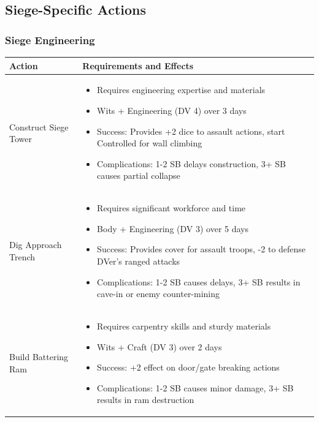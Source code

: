 \documentclass[11pt,letterpaper]{article}
\begin{document}
\subsection{Siege-Specific Actions}

\subsubsection{Siege Engineering}

\begin{longtable}{|>{\raggedright\arraybackslash}p{4cm}|>{\raggedright\arraybackslash}p{8cm}|}
\hline
\textbf{Action} & \textbf{Requirements and Effects} \\
\hline
Construct Siege Tower & 
\begin{itemize}
    \item Requires engineering expertise and materials
    \item Wits + Engineering (DV 4) over 3 days
    \item Success: Provides +2 dice to assault actions, start Controlled for wall climbing
    \item Complications: 1-2 SB delays construction, 3+ SB causes partial collapse
\end{itemize} \\
\hline
Dig Approach Trench & 
\begin{itemize}
    \item Requires significant workforce and time
    \item Body + Engineering (DV 3) over 5 days
    \item Success: Provides cover for assault troops, -2 to defense DVer's ranged attacks
    \item Complications: 1-2 SB causes delays, 3+ SB results in cave-in or enemy counter-mining
\end{itemize} \\
\hline
Build Battering Ram & 
\begin{itemize}
    \item Requires carpentry skills and sturdy materials
    \item Wits + Craft (DV 3) over 2 days
    \item Success: +2 effect on door/gate breaking actions
    \item Complications: 1-2 SB causes minor damage, 3+ SB results in ram destruction
\end{itemize} \\
\hline
\end{longtable}
\end{document}
